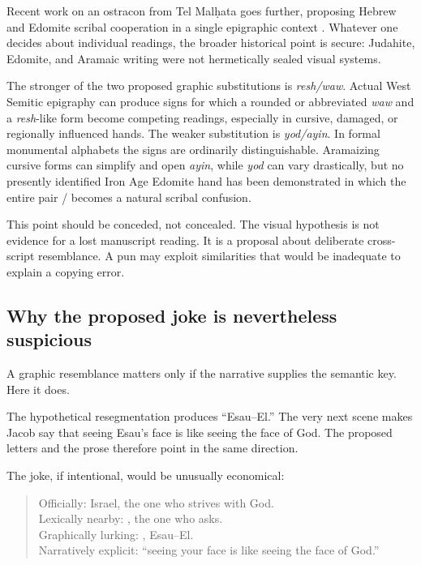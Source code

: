 Recent work on an ostracon from Tel Mal\d{h}ata goes further, proposing Hebrew and Edomite scribal cooperation in a single epigraphic context \parencite{Wimmer2023}. Whatever one decides about individual readings, the broader historical point is secure: Judahite, Edomite, and Aramaic writing were not hermetically sealed visual systems.

The stronger of the two proposed graphic substitutions is \emph{resh/waw}. Actual West Semitic epigraphy can produce signs for which a rounded or abbreviated \emph{waw} and a \emph{resh}-like form become competing readings, especially in cursive, damaged, or regionally influenced hands. The weaker substitution is \emph{yod/ayin}. In formal monumental alphabets the signs are ordinarily distinguishable. Aramaizing cursive forms can simplify and open \emph{ayin}, while \emph{yod} can vary drastically, but no presently identified Iron Age Edomite hand has been demonstrated in which the entire pair / becomes a natural scribal confusion.

This point should be conceded, not concealed. The visual hypothesis is not evidence for a lost manuscript reading. It is a proposal about deliberate cross-script resemblance. A pun may exploit similarities that would be inadequate to explain a copying error.

\subsection{Why the proposed joke is nevertheless suspicious}

A graphic resemblance matters only if the narrative supplies the semantic key. Here it does.

The hypothetical resegmentation produces ``Esau--El.'' The very next scene makes Jacob say that seeing Esau's face is like seeing the face of God. The proposed letters and the prose therefore point in the same direction.

The joke, if intentional, would be unusually economical:

\begin{quote}\small
Officially: Israel, the one who strives with God.\\
Lexically nearby: , the one who asks.\\
Graphically lurking: , Esau--El.\\
Narratively explicit: ``seeing your face is like seeing the face of God.''
\end{quote}

